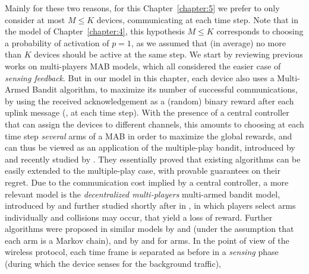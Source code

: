 Mainly for these two reasons, for this Chapter~\ref{chapter:5} we prefer to only consider at most $M \leq K$ devices, communicating at each time step.
Note that in the model of Chapter~\ref{chapter:4}, this hypothesis $M \leq K$ corresponds to choosing a probability of activation of $p=1$, as we assumed that (in average) no more than $K$ devices should be active at the same step.
%
We start by reviewing previous works on multi-players MAB models, which all considered the easier case of \emph{sensing feedback}.
But in our model in this chapter, each device also uses a Multi-Armed Bandit algorithm, to maximize its number of successful communications, by using the received acknowledgement \Ack{} as a (random) binary reward after each uplink message (\ie, at each time step).
%
With the presence of a central controller that can assign the devices to different channels, this amounts to choosing at each time step \emph{several} arms of a MAB in order to maximize the global rewards, and can thus be viewed as an application of the multiple-play bandit, introduced by \cite{Anantharam87a} and recently studied by \cite{Komiyama15}.
They essentially proved that existing algorithms can be easily extended to the multiple-play case, with provable guarantees on their regret.
%
%
Due to the communication cost implied by a central controller, a more relevant model is the
\emph{decentralized multi-players} multi-armed bandit model, introduced by \cite{Zhao10} and further studied shortly after in \cite{Anandkumar10,Anandkumar11}, in which players select arms individually and collisions may occur, that yield a loss of reward.
Further algorithms were proposed in similar models by \cite{Tekin12IEEE} and \cite{Kalathil12} (under the assumption that each arm is a Markov chain),
and by \cite{Avner15,Avner16} and \cite{Rosenski16} for \iid{} arms.
%
In the point of view of the wireless protocol, each time frame is separated as before in a \emph{sensing} phase (during which the device senses for the background traffic),
